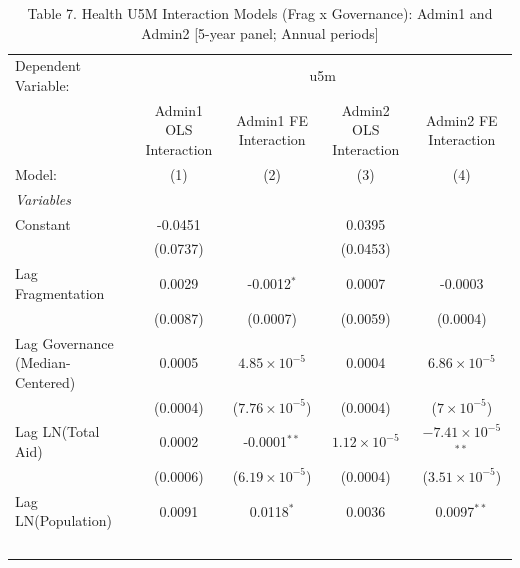 
\begin{table}[H]
   \caption{Table 7. Health U5M Interaction Models (Frag x Governance): Admin1 and Admin2 [5-year panel; Annual periods]}
   \centering
   \begin{tabular}{lcccc}
      \tabularnewline \midrule \midrule
      Dependent Variable: & \multicolumn{4}{c}{u5m}\\
                                                           & Admin1 OLS Interaction & Admin1 FE Interaction   & Admin2 OLS Interaction & Admin2 FE Interaction \\   
      Model:                                               & (1)                    & (2)                     & (3)                    & (4)\\  
      \midrule
      \emph{Variables}\\
      Constant                                             & -0.0451                &                         & 0.0395                 &   \\   
                                                           & (0.0737)               &                         & (0.0453)               &   \\   
      Lag Fragmentation                                    & 0.0029                 & -0.0012$^{*}$           & 0.0007                 & -0.0003\\   
                                                           & (0.0087)               & (0.0007)                & (0.0059)               & (0.0004)\\   
      Lag Governance (Median-Centered)                     & 0.0005                 & $4.85\times 10^{-5}$    & 0.0004                 & $6.86\times 10^{-5}$\\    
                                                           & (0.0004)               & ($7.76\times 10^{-5}$)  & (0.0004)               & ($7\times 10^{-5}$)\\    
      Lag LN(Total Aid)                                    & 0.0002                 & -0.0001$^{**}$          & $1.12\times 10^{-5}$   & $-7.41\times 10^{-5}$$^{**}$\\    
                                                           & (0.0006)               & ($6.19\times 10^{-5}$)  & (0.0004)               & ($3.51\times 10^{-5}$)\\    
      Lag LN(Population)                                   & 0.0091                 & 0.0118$^{*}$            & 0.0036                 & 0.0097$^{**}$\\   
$$
\end{tabular}
\end{table}
